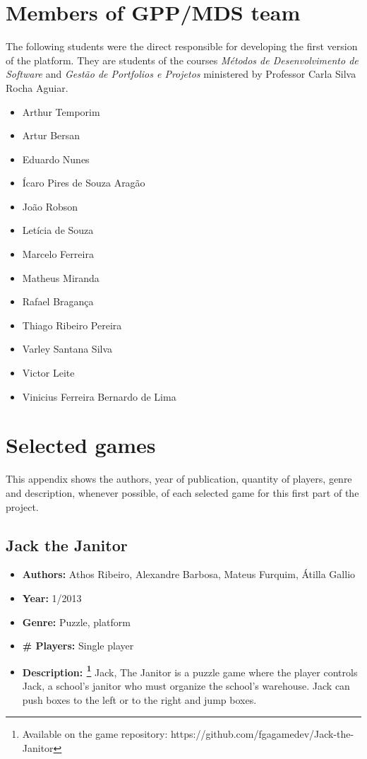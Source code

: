 \begin{apendicesenv}

\partapendices

\chapter{Members of GPP/MDS team}
\label {sec:apendice_a}

The following students were the direct responsible for developing the first version of the platform. They are students of the courses \textit{M\'etodos de Desenvolvimento de Software} and \textit{Gest\~ao de Portfolios e Projetos} ministered by Professor Carla Silva Rocha Aguiar.

\begin{itemize}
\item Arthur Temporim
\item Artur Bersan
\item Eduardo Nunes
\item Ícaro Pires de Souza Aragão
\item João Robson
\item Letícia de Souza
\item Marcelo Ferreira
\item Matheus Miranda
\item Rafael Bragança
\item Thiago Ribeiro Pereira
\item Varley Santana Silva
\item Victor Leite
\item Vinicius Ferreira Bernardo de Lima
\end{itemize}

\chapter{Selected games}
\label {sec:selected_games}

This appendix shows the authors, year of publication, quantity of players, genre and description, whenever possible, of each selected game for this first part of the project.

\section{Jack the Janitor}
\label {sec:jack_the_janitor}

\begin{itemize}
\item[] \textbf{Authors:} Athos Ribeiro, Alexandre Barbosa, Mateus Furquim, Átilla Gallio
\item[] \textbf{Year:} 1/2013
\item[] \textbf{Genre:} Puzzle, platform
\item[] \textbf{\# Players:} Single player
\item[] \textbf{Description: \footnote{Available on the game repository: https://github.com/fgagamedev/Jack-the-Janitor}} Jack, The Janitor is a puzzle game where the player controls Jack, a school's janitor who must organize the school's warehouse. Jack can push boxes to the left or to the right and jump boxes.


\end{itemize}
\end{apendicesenv}
